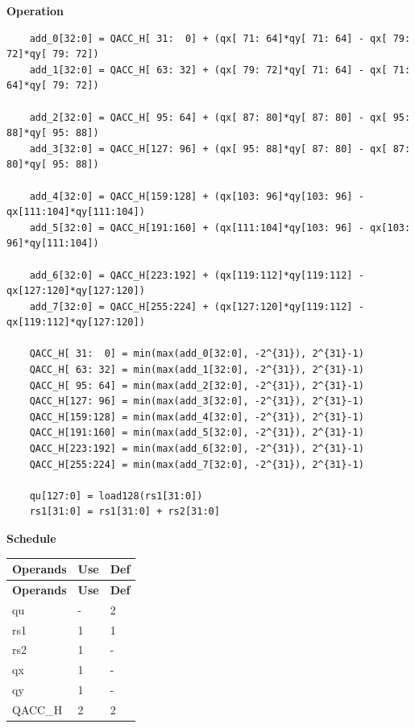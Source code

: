 \textbf{Operation}\\
\begin{lstlisting}
    add_0[32:0] = QACC_H[ 31:  0] + (qx[ 71: 64]*qy[ 71: 64] - qx[ 79: 72]*qy[ 79: 72])
    add_1[32:0] = QACC_H[ 63: 32] + (qx[ 79: 72]*qy[ 71: 64] - qx[ 71: 64]*qy[ 79: 72])

    add_2[32:0] = QACC_H[ 95: 64] + (qx[ 87: 80]*qy[ 87: 80] - qx[ 95: 88]*qy[ 95: 88])
    add_3[32:0] = QACC_H[127: 96] + (qx[ 95: 88]*qy[ 87: 80] - qx[ 87: 80]*qy[ 95: 88])

    add_4[32:0] = QACC_H[159:128] + (qx[103: 96]*qy[103: 96] - qx[111:104]*qy[111:104])
    add_5[32:0] = QACC_H[191:160] + (qx[111:104]*qy[103: 96] - qx[103: 96]*qy[111:104])

    add_6[32:0] = QACC_H[223:192] + (qx[119:112]*qy[119:112] - qx[127:120]*qy[127:120])
    add_7[32:0] = QACC_H[255:224] + (qx[127:120]*qy[119:112] - qx[119:112]*qy[127:120])

    QACC_H[ 31:  0] = min(max(add_0[32:0], -2^{31}), 2^{31}-1)
    QACC_H[ 63: 32] = min(max(add_1[32:0], -2^{31}), 2^{31}-1)
    QACC_H[ 95: 64] = min(max(add_2[32:0], -2^{31}), 2^{31}-1)
    QACC_H[127: 96] = min(max(add_3[32:0], -2^{31}), 2^{31}-1)
    QACC_H[159:128] = min(max(add_4[32:0], -2^{31}), 2^{31}-1)
    QACC_H[191:160] = min(max(add_5[32:0], -2^{31}), 2^{31}-1)
    QACC_H[223:192] = min(max(add_6[32:0], -2^{31}), 2^{31}-1)
    QACC_H[255:224] = min(max(add_7[32:0], -2^{31}), 2^{31}-1)

    qu[127:0] = load128(rs1[31:0])
    rs1[31:0] = rs1[31:0] + rs2[31:0]
\end{lstlisting}

\textbf{Schedule}\\
\begin{longtable}[c]{|l|l|l|}
    \hline
    \rowcolor{lightgray}
    \textbf{Operands} & \textbf{Use} & \textbf{Def} \\\hline
    \endfirsthead
    \hline
    \rowcolor{lightgray}
     \textbf{Operands} & \textbf{Use} & \textbf{Def} \\\hline
    \endhead
    \hline
    \endfoot

    qu & - & 2 \\\hline
    rs1 & 1 & 1 \\\hline
    rs2 & 1 & - \\\hline
     qx & 1 & - \\\hline
     qy & 1 & - \\\hline
     QACC\_H & 2 & 2

\end{longtable}

